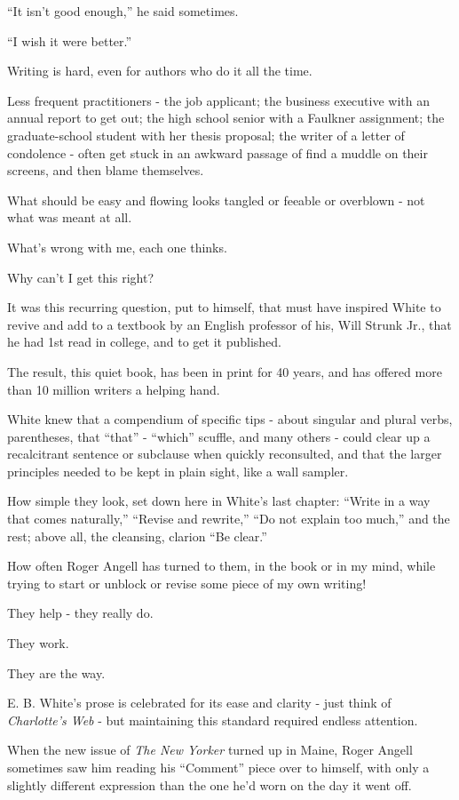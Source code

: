 \documentclass{article}
\begin{document}
``It isn't good enough,'' he said sometimes.

``I wish it were better.''

%
Writing is hard, even for authors who do it all the time.

Less frequent practitioners - the job applicant; the business executive with an annual report to get out; the high school senior with a Faulkner assignment; the graduate-school student with her thesis proposal; the writer of a letter of condolence - often get stuck in an awkward passage of find a muddle on their screens, and then blame themselves.

What should be easy and flowing looks tangled or feeable or overblown - not what was meant at all.

What's wrong with me, each one thinks.

Why can't I get this right?

%
It was this recurring question, put to himself, that must have inspired White to revive and add to a textbook by an English professor of his, Will Strunk Jr., that he had 1st read in college, and to get it published.

The result, this quiet book, has been in print for 40 years, and has offered more than 10 million writers a helping hand.

White knew that a compendium of specific tips - about singular and plural verbs, parentheses, that ``that'' - ``which'' scuffle, and many others - could clear up a recalcitrant sentence or subclause when quickly reconsulted, and that the larger principles needed to be kept in plain sight, like a wall sampler.

%
How simple they look, set down here in White's last chapter: ``Write in a way that comes naturally,'' ``Revise and rewrite,'' ``Do not explain too much,'' and the rest; above all, the cleansing, clarion ``Be clear.''

How often Roger Angell has turned to them, in the book or in my mind, while trying to start or unblock or revise some piece of my own writing!

They help - they really do.

They work.

They are the way.

%
E. B. White's prose is celebrated for its ease and clarity - just think of {\it Charlotte's Web} - but maintaining this standard required endless attention.

When the new issue of {\it The New Yorker} turned up in Maine, Roger Angell sometimes saw him reading his ``Comment'' piece over to himself, with only a slightly different expression than the one he'd worn on the day it went off.
\end{document}
